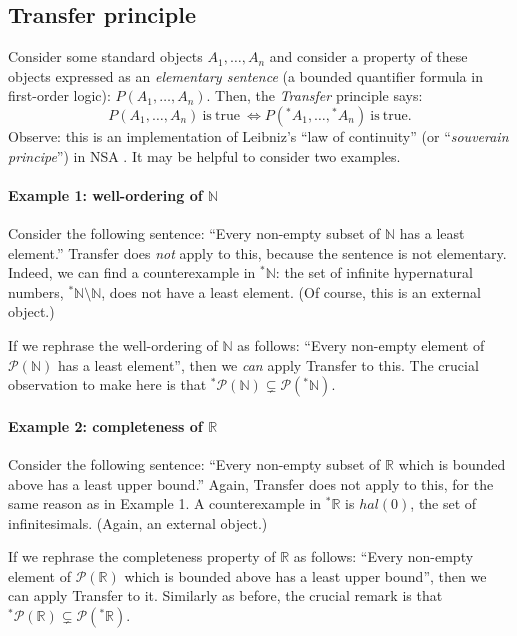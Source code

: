 \subsection{Transfer principle}
Consider some standard objects $A_1,\ldots,A_n$ and consider a property of these objects expressed as an \textit{elementary sentence} (a bounded quantifier formula in first-order logic): $P(A_1,\ldots,A_n)$.
Then, the \textit{Transfer} principle says:
$$
P(A_1,\ldots,A_n) \mathrm{\ is\ true\ } \Leftrightarrow P({^\ast A}_1,\ldots,{^\ast A}_n) \mathrm{\ is\ true}.
$$
Observe: this is an implementation of Leibniz's ``law of continuity'' (or ``\textit{souverain principe}'') in NSA \citep[see][section~4.3]{KatzSherry:2012a}. It may be helpful to consider two examples.

\paragraph{Example 1: well-ordering of $\mathbb{N}$}
Consider the following sentence: ``Every non-empty subset of $\mathbb{N}$ has a least element.'' Transfer does \emph{not} apply to this, because the sentence is not elementary. Indeed, we can find a counterexample in ${^\ast \mathbb{N}}$: the set of infinite hypernatural numbers, ${^\ast \mathbb{N}} \setminus \mathbb{N}$, does not have a least element. (Of course, this is an external object.)

If we rephrase the well-ordering of $\mathbb{N}$ as follows: ``Every non-empty element of $\mathcal{P}(\mathbb{N})$ has a least element'', then we \emph{can} apply Transfer to this.
The crucial observation to make here is that ${^\ast \mathcal{P}}(\mathbb{N}) \subsetneq \mathcal{P}({^\ast \mathbb{N}})$.

\paragraph{Example 2: completeness of $\mathbb{R}$}
Consider the following sentence: ``Every non-empty subset of $\mathbb{R}$ which is bounded above has a least upper bound.'' Again, Transfer does not apply to this, for the same reason as in Example 1. A counterexample in ${^\ast \mathbb{R}}$ is $hal(0)$, the set of infinitesimals. (Again, an external object.)

If we rephrase the completeness property of $\mathbb{R}$ as follows: ``Every non-empty element of $\mathcal{P}(\mathbb{R})$ which is bounded above has a least upper bound'', then we can apply Transfer to it. Similarly as before, the crucial remark is that ${^\ast \mathcal{P}}(\mathbb{R}) \subsetneq \mathcal{P}({^\ast \mathbb{R}})$.

